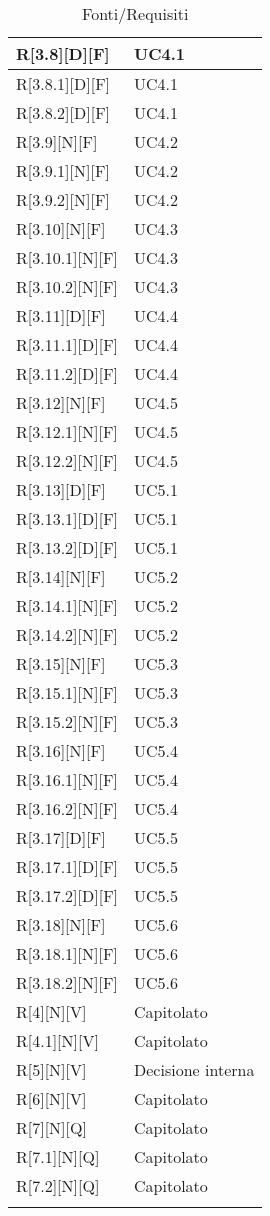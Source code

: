 \begin{longtable}{X | X}
\hline
R[3.8][D][F] & UC4.1 \\
\hline
R[3.8.1][D][F] & UC4.1 \\
\hline
R[3.8.2][D][F] & UC4.1 \\
\hline
R[3.9][N][F] & UC4.2 \\
\hline
R[3.9.1][N][F] & UC4.2 \\
\hline
R[3.9.2][N][F] & UC4.2 \\
\hline
R[3.10][N][F] & UC4.3 \\
\hline
R[3.10.1][N][F] & UC4.3 \\
\hline
R[3.10.2][N][F] & UC4.3 \\
\hline
R[3.11][D][F] & UC4.4 \\
\hline
R[3.11.1][D][F] & UC4.4 \\
\hline
R[3.11.2][D][F] & UC4.4 \\
\hline
R[3.12][N][F] & UC4.5 \\
\hline
R[3.12.1][N][F] & UC4.5 \\
\hline
R[3.12.2][N][F] & UC4.5 \\
\hline
R[3.13][D][F] & UC5.1 \\
\hline
R[3.13.1][D][F] & UC5.1 \\
\hline
R[3.13.2][D][F] & UC5.1 \\
\hline
R[3.14][N][F] & UC5.2 \\
\hline
R[3.14.1][N][F] & UC5.2 \\
\hline
R[3.14.2][N][F] & UC5.2 \\
\hline
R[3.15][N][F] & UC5.3 \\
\hline
R[3.15.1][N][F] & UC5.3 \\
\hline
R[3.15.2][N][F] & UC5.3 \\
\hline
R[3.16][N][F] & UC5.4 \\
\hline
R[3.16.1][N][F] & UC5.4 \\
\hline
R[3.16.2][N][F] & UC5.4 \\
\hline
R[3.17][D][F] & UC5.5 \\
\hline
R[3.17.1][D][F] & UC5.5 \\
\hline
R[3.17.2][D][F] & UC5.5 \\
\hline
R[3.18][N][F] & UC5.6 \\
\hline
R[3.18.1][N][F] & UC5.6 \\
\hline
R[3.18.2][N][F] & UC5.6 \\
\hline
R[4][N][V] & Capitolato \\
\hline
R[4.1][N][V] & Capitolato \\
\hline
R[5][N][V] & Decisione interna \\
\hline
R[6][N][V] & Capitolato \\
\hline
R[7][N][Q] & Capitolato \\
\hline
R[7.1][N][Q] & Capitolato \\
\hline
R[7.2][N][Q] & Capitolato \\
\hline

\bottomrule
\caption{Fonti/Requisiti}
\end{longtable}   